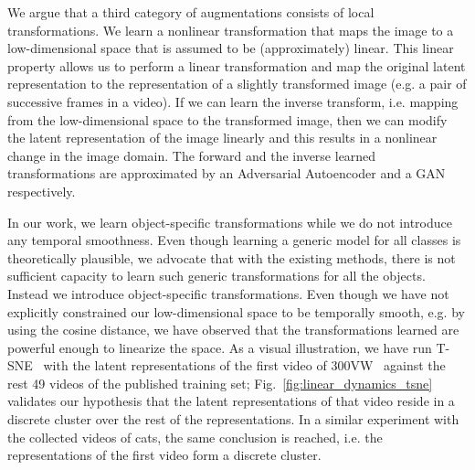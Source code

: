 \documentclass[10pt,twocolumn,letterpaper]{article}
\begin{document}
We argue that a third category of augmentations consists of local transformations. We learn a nonlinear transformation that maps the image to a low-dimensional space that is assumed to be (approximately) linear. This linear property allows us to perform a linear transformation and map the original latent representation to the representation of a slightly transformed image (e.g. a pair of successive frames in a video). If we can learn the inverse transform, i.e. mapping from the low-dimensional space to the transformed image, then we can modify the latent representation of the image linearly and this results in a nonlinear change in the image domain. 
The forward and the inverse learned transformations are approximated by an Adversarial Autoencoder and a GAN respectively. 

In our work, we learn object-specific transformations while we do not introduce any temporal smoothness. Even though learning a generic model for all classes is theoretically plausible, we advocate that with the existing methods, there is not sufficient capacity to learn such generic transformations for all the objects. Instead we introduce object-specific transformations.  
Even though we have not explicitly constrained our low-dimensional space to be temporally smooth, e.g. by using the cosine distance, we have observed that the transformations learned are powerful enough to linearize the space. As a visual illustration, we have run T-SNE~\cite{maaten2008visualizing} with the  latent representations of the first video of 300VW~\cite{shen2015first} against the rest 49 videos of the published training set; Fig.~\ref{fig:linear_dynamics_tsne} validates our hypothesis that the latent representations of that video reside in a discrete cluster over the rest of the representations. In a similar experiment with the collected videos of cats, the same conclusion is reached, i.e. the representations of the first video form a discrete cluster. 
\end{document}
